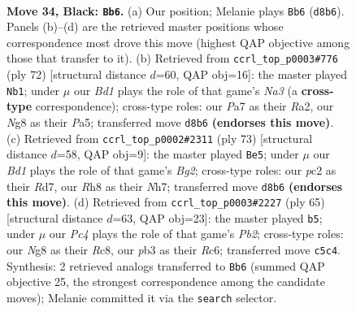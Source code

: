 \documentclass[11pt]{article}
\begin{document}
\clearpage

\begin{figure}[p]\centering
\begin{subfigure}{0.46\textwidth}\centering
\resizebox{\linewidth}{!}{%
\newchessgame
\chessboard[
  setfen={r2b2nr/p4k1p/8/2p5/5B2/PP1B3P/R1P3P1/1R4K1 b - - 0 34},
  showmover=false,
  pgfstyle=straightmove, color=movearrow, markmove={d8-b6}
]}
\caption{}
\end{subfigure}\hfill
\begin{subfigure}{0.46\textwidth}\centering
\resizebox{\linewidth}{!}{%
\newchessgame
\chessboard[
  setfen={1rr3k1/7p/6p1/P3p3/3bp3/N6P/R4PP1/5R1K w - - 0 37},
  showmover=false,
  pgfstyle=straightmove, color=movearrow, markmove={a3-b1}
]}
\caption{}
\end{subfigure}
\\[4pt]
\begin{subfigure}{0.46\textwidth}\centering
\resizebox{\linewidth}{!}{%
\newchessgame
\chessboard[
  setfen={r5k1/3r2bn/1BRp4/1p1P1Pp1/4B1Pp/7P/1P1R4/6K1 b - - 0 37},
  showmover=false,
  pgfstyle=straightmove, color=movearrow, markmove={g7-e5}
]}
\caption{}
\end{subfigure}\hfill
\begin{subfigure}{0.46\textwidth}\centering
\resizebox{\linewidth}{!}{%
\newchessgame
\chessboard[
  setfen={2r5/1p3kb1/p1rpp3/6Bp/4P2P/5P2/PP3R2/1K1R4 b - - 7 33},
  showmover=false,
  pgfstyle=straightmove, color=movearrow, markmove={b7-b5}
]}
\caption{}
\end{subfigure}
\caption{\textbf{Move 34, Black: \texttt{Bb6}.} (a) Our position; Melanie plays \texttt{Bb6} (\texttt{d8b6}). Panels (b)--(d) are the retrieved master positions whose correspondence most drove this move (highest QAP objective among those that transfer to it). (b) Retrieved from \texttt{ccrl\_top\_p0003\#776} (ply 72) [structural distance $d$=60, QAP obj=16]: the master played \texttt{Nb1}; under $\mu$ our \emph{Bd1} plays the role of that game's \emph{Na3} (a \textbf{cross-type} correspondence); cross-type roles: our \emph{P}a7 as their \emph{R}a2, our \emph{N}g8 as their \emph{P}a5; transferred move \texttt{d8b6} \textbf{(endorses this move)}. (c) Retrieved from \texttt{ccrl\_top\_p0002\#2311} (ply 73) [structural distance $d$=58, QAP obj=9]: the master played \texttt{Be5}; under $\mu$ our \emph{Bd1} plays the role of that game's \emph{Bg2}; cross-type roles: our \emph{p}c2 as their \emph{R}d7, our \emph{R}h8 as their \emph{N}h7; transferred move \texttt{d8b6} \textbf{(endorses this move)}. (d) Retrieved from \texttt{ccrl\_top\_p0003\#2227} (ply 65) [structural distance $d$=63, QAP obj=23]: the master played \texttt{b5}; under $\mu$ our \emph{Pc4} plays the role of that game's \emph{Pb2}; cross-type roles: our \emph{N}g8 as their \emph{R}c8, our \emph{p}b3 as their \emph{R}c6; transferred move \texttt{c5c4}. Synthesis: 2 retrieved analogs transferred to \texttt{Bb6} (summed QAP objective 25, the strongest correspondence among the candidate moves); Melanie committed it via the \texttt{search} selector.}
\label{fig:thought-m67}
\end{figure}
\end{document}
